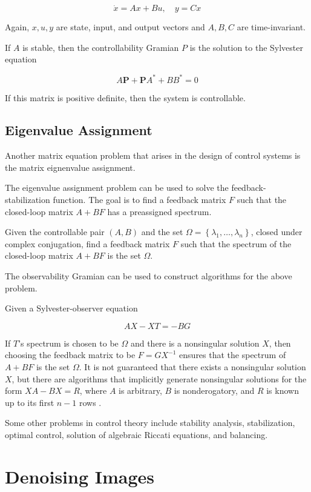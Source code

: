 \documentclass{article}
\begin{document}
\[\dot{x}=A x+B u, \quad y=C x\]

Again, $x, u, y$ are state, input, and output vectors and $A,B,C$ are time-invariant.

If $A$ is stable, then the controllability Gramian $P$ is the solution to the Sylvester equation

\[A \mathbf{P}+\mathbf{P} A^{*}+B B^{*}=0\]

If this matrix is positive definite, then the system is controllable.

\subsection{Eigenvalue Assignment}

Another matrix equation problem that arises in the design of control systems is the matrix eignenvalue assignment.

The eigenvalue assignment problem can be used to solve the feedback-stabilization function. The goal is to find a feedback matrix $F$ such that the closed-loop matrix $A+BF$ has a preassigned spectrum. 

Given the controllable pair $(A, B)$ and the set $\Omega=\left\{\lambda_{1}, \ldots, \lambda_{n}\right\}$, closed under complex conjugation, find a feedback matrix $F$ such that the spectrum of the closed-loop matrix $A + BF$ is the set $\Omega$.

The observability Gramian can be used to construct algorithms for the above problem.

Given a Sylvester-observer equation 

\[A X-X T=-B G\]

If $T$'s spectrum is chosen to be $\Omega$ and there is a nonsingular solution $X$, then choosing the feedback matrix to be $F = GX^{-1}$ ensures that the spectrum of $A + BF$ is the set $\Omega$. It is not guaranteed that there exists a nonsingular solution $X$, but there are algorithms that implicitly generate nonsingular solutions for the form  $XA - BX = R$, where $A$ is arbitrary, $B$ is nonderogatory, and $R$ is known up to its first $n-1$ rows \cite{Datta}.


Some other problems in control theory include  stability analysis, stabilization, optimal control, solution of algebraic Riccati equations, and balancing.

\section{Denoising Images}
\end{document}
